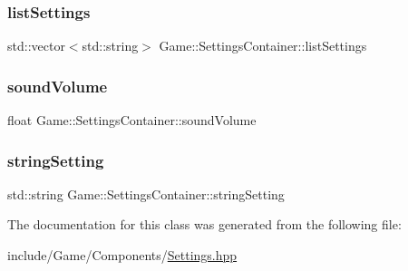 \subsubsection{\texorpdfstring{list\+Settings}{listSettings}}
{\footnotesize\ttfamily std\+::vector$<$std\+::string$>$ Game\+::\+Settings\+Container\+::list\+Settings}

\mbox{\label{class_game_1_1_settings_container_a27a693595271cf8c08911c1860b39b0b}} 
\subsubsection{\texorpdfstring{sound\+Volume}{soundVolume}}
{\footnotesize\ttfamily float Game\+::\+Settings\+Container\+::sound\+Volume}

\mbox{\label{class_game_1_1_settings_container_aca4afe02a4af31e715f795b7408a6dfe}} 
\subsubsection{\texorpdfstring{string\+Setting}{stringSetting}}
{\footnotesize\ttfamily std\+::string Game\+::\+Settings\+Container\+::string\+Setting}



The documentation for this class was generated from the following file\+:\begin{DoxyCompactItemize}
\item 
include/\+Game/\+Components/\mbox{\hyperlink{_settings_8hpp}{Settings.\+hpp}}\end{DoxyCompactItemize}
